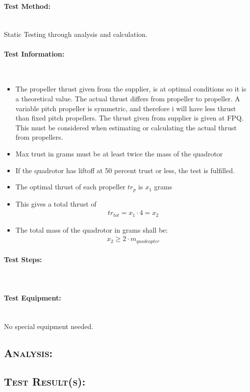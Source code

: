 \paragraph{Test Method:}\mbox{}\\
Static Testing through analysis and calculation.

\paragraph{Test Information:}\mbox{}\\
\begin{itemize}
\item  The propeller thrust given from the supplier, is at optimal conditions so it is a theoretical value. The actual thrust differs from propeller to propeller. A variable pitch propeller is symmetric, and therefore i will have less thrust than fixed pitch propellers. The thrust given from supplier is given at FPQ. This must be considered when estimating or calculating the actual thrust from propellers.
\item Max trust in grams must be at least twice the mass of the quadrotor
\item If the quadrotor has liftoff at 50 percent trust or less, the test is fulfilled.
\item The optimal thrust of each propeller $tr_p$ is $x_1$ grams
\item This gives a total thrust of
    \begin{equation}
    \begin{split}
        tr_{tot} = x_1\cdot4 = x_2
    \end{split}
    \end{equation}
\item The total mass of the quadrotor in  grams shall be:
    \begin{equation}
    \begin{split}
        x_2 \geq 2\cdot m_{quadcopter} 
    \end{split}
    \end{equation}
\end{itemize}
\paragraph{Test Steps:}\mbox{}\\
\paragraph{Test Equipment:}\mbox{}\\
No special equipment needed.
\subsection{\textsc{\medium Analysis:}}
\subsection{\textsc{\medium Test Result(s):}}
\newpage